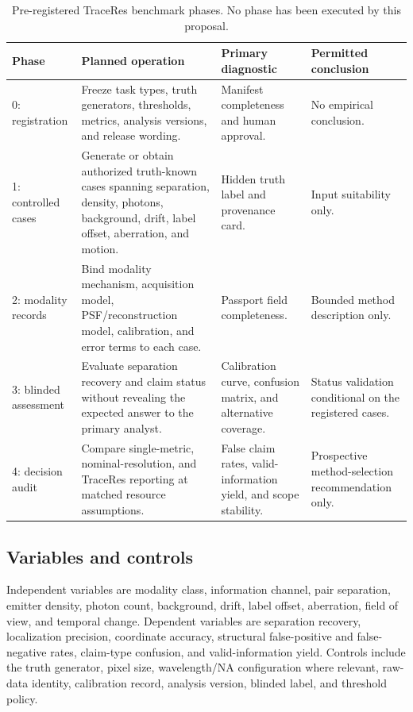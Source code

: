 \documentclass[conference]{IEEEtran}
\begin{document}
\begin{table}[t]
\caption{Pre-registered TraceRes benchmark phases. No phase has been executed by this proposal.}
\label{tab:design}
\centering
\footnotesize
\setlength{\tabcolsep}{3pt}
\begin{tabular}{p{} p{} p{} p{}}
\hline
\textbf{Phase} & \textbf{Planned operation} & \textbf{Primary diagnostic} & \textbf{Permitted conclusion}\\
\hline
0: registration & Freeze task types, truth generators, thresholds, metrics, analysis versions, and release wording. & Manifest completeness and human approval. & No empirical conclusion.\\
1: controlled cases & Generate or obtain authorized truth-known cases spanning separation, density, photons, background, drift, label offset, aberration, and motion. & Hidden truth label and provenance card. & Input suitability only.\\
2: modality records & Bind modality mechanism, acquisition model, PSF/reconstruction model, calibration, and error terms to each case. & Passport field completeness. & Bounded method description only.\\
3: blinded assessment & Evaluate separation recovery and claim status without revealing the expected answer to the primary analyst. & Calibration curve, confusion matrix, and alternative coverage. & Status validation conditional on the registered cases.\\
4: decision audit & Compare single-metric, nominal-resolution, and TraceRes reporting at matched resource assumptions. & False claim rates, valid-information yield, and scope stability. & Prospective method-selection recommendation only.\\
\hline
\end{tabular}
\end{table}

\subsection{Variables and controls}

Independent variables are modality class, information channel, pair separation, emitter density, photon count, background, drift, label offset, aberration, field of view, and temporal change. Dependent variables are separation recovery, localization precision, coordinate accuracy, structural false-positive and false-negative rates, claim-type confusion, and valid-information yield. Controls include the truth generator, pixel size, wavelength/NA configuration where relevant, raw-data identity, calibration record, analysis version, blinded label, and threshold policy.
\end{document}
